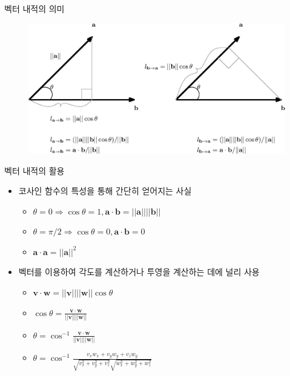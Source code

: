 \begin{frame}{벡터 내적의 의미}
\begin{figure}
\includegraphics[width=12cm]{Math_vector/innerProduct.eps}
\end{figure}

\end{frame}


\begin{frame}{벡터 내적의 활용}
\begin{itemize}
\item 코사인 함수의 특성을 통해 간단히 얻어지는 사실
	\begin{itemize}
	\item $\theta = 0 \Rightarrow \cos \theta = 1 , \mathbf a \cdot \mathbf b = ||\mathbf a|| ||\mathbf b|| $
	\item $\theta = \pi / 2 \Rightarrow \cos \theta = 0, \mathbf a \cdot \mathbf b = 0 $
	\item $\mathbf a \cdot \mathbf a =  ||\mathbf a||^2$
	\end{itemize}
\end{itemize}


\begin{itemize}
\item 벡터를 이용하여 각도를 계산하거나 투영을 계산하는 데에 널리 사용
	\begin{itemize}
	\item $ \mathbf v \cdot \mathbf w  =  ||\mathbf v|| ||\mathbf w|| \cos \theta $
	\item $ \cos \theta = \frac{\mathbf v \cdot \mathbf w}{||\mathbf v||||\mathbf w||} $
	\item $ \theta  = \cos^{-1} \frac{\mathbf v \cdot \mathbf w}{||\mathbf v||||\mathbf w||} $
	\item $ \theta =  \cos^{-1}\frac{ v_x w_x + v_y w_y + v_z w_y}{\sqrt{v_x^2 + v_y^2 + v_z^2} \sqrt{w_x^2 + w_y^2 + w_z^2} }$
	\end{itemize} 
\end{itemize}

\end{frame}


